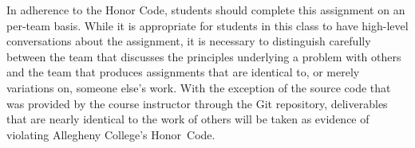 In adherence to the Honor Code, students should complete this assignment on an per-team basis. While it is appropriate
for students in this class to have high-level conversations about the assignment, it is necessary to distinguish
carefully between the team that discusses the principles underlying a problem with others and the team that produces
assignments that are identical to, or merely variations on, someone else's work.  With the exception of the source code
that was provided by the course instructor through the Git repository, deliverables that are nearly identical to the
work of others will be taken as evidence of violating Allegheny College's \mbox{Honor Code}.


